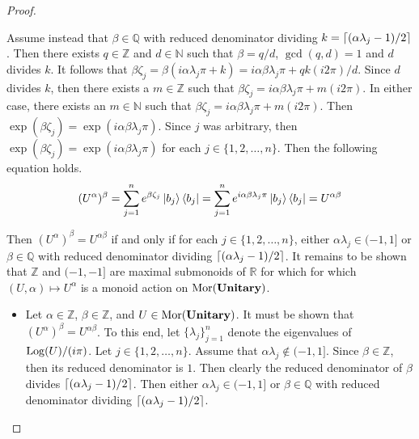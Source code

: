 \begin{proof}
\begin{itemize}
          Assume instead that $\beta \in \mathbb{Q}$ with reduced denominator dividing $k = \ceil*{( \alpha \lambda_j - 1 ) / 2}$.
          Then there exists $q \in \mathbb{Z}$ and $d \in \mathbb{N}$ such that $\beta = q / d$, $\gcd( q, d ) = 1$ and $d$ divides $k$.
          It follows that $\beta\zeta_j = \beta( i\alpha\lambda_j\pi + k ) = i\alpha\beta\lambda_j\pi + q k (i2\pi) / d$.
          Since $d$ divides $k$, then there exists a $m \in \mathbb{Z}$ such that $\beta\zeta_j = i\alpha\beta\lambda_j\pi + m(i2\pi)$.
          In either case, there exists an $m \in \mathbb{N}$ such that $\beta\zeta_j = i\alpha\beta\lambda_j\pi + m(i2\pi)$.
          Then $\exp( \beta\zeta_j ) = \exp( i\alpha\beta\lambda_j\pi )$.
          Since $j$ was arbitrary, then $\exp( \beta\zeta_j ) = \exp( i\alpha\beta\lambda_j\pi )$ for each $j \in \{ 1, 2, \ldots, n \}$.
          Then the following equation holds.
          \begin{equation*}
              ( U^\alpha )^\beta
              =
              \sum_{j=1}^n e^{\beta\zeta_j} \ket{b_j} \bra{b_j}
              =
              \sum_{j=1}^n e^{i\alpha\beta\lambda_j\pi} \ket{b_j} \bra{b_j}
              =
              U^{\alpha\beta}
          \end{equation*}
    \end{itemize}
    Then $( U^\alpha )^\beta = U^{\alpha\beta}$ if and only if for each $j \in \{ 1, 2, \ldots, n \}$, either $\alpha \lambda_j \in ( -1, 1 ]$ or $\beta \in \mathbb{Q}$ with reduced denominator dividing $\ceil*{( \alpha \lambda_j - 1 ) / 2}$.
    It remains to be shown that $\mathbb{Z}$ and $( -1, - 1]$ are maximal submonoids of $\mathbb{R}$ for which for which $( U, \alpha ) \mapsto U^\alpha$ is a monoid action on $\Mor( \CatUnitary )$.
    \begin{itemize}
    \item Let $\alpha \in \mathbb{Z}$, $\beta \in \mathbb{Z}$, and $U \in \Mor( \CatUnitary )$.
          It must be shown that $( U^\alpha )^\beta = U^{\alpha\beta}$.
          To this end, let $\{ \lambda_j \}_{j=1}^n$ denote the eigenvalues of $\Log( U ) / (i\pi)$.
          Let $j \in \{ 1, 2, \ldots, n \}$.
          Assume that $\alpha\lambda_j \not \in ( -1, 1 ]$.
          Since $\beta \in \mathbb{Z}$, then its reduced denominator is $1$.
          Then clearly the reduced denominator of $\beta$ divides $\ceil*{( \alpha \lambda_j - 1 ) / 2}$.
          Then either $\alpha\lambda_j \in ( -1, 1 ]$ or $\beta \in \mathbb{Q}$ with reduced denominator dividing $\ceil{( \alpha \lambda_j - 1) / 2 }$.

\end{itemize}
\end{proof}
